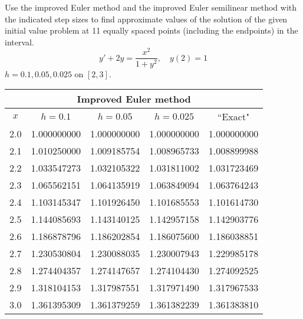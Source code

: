 \documentclass{ximera}
\begin{document}
\begin{problem}\label{exer:3.2.22} Use the improved Euler method and the improved Euler semilinear method with the indicated step sizes to find approximate values of the solution of the given initial value problem at 11 equally spaced points (including the endpoints) in the interval.
$$y'+2y=\frac{x^2}{1+y^2},\quad y(2)=1$$
 $h=0.1,0.05,0.025$ on $[2,3]$.

 \begin{solution}
     {\small
\begin{tabular}{|c|r|r|r|r|}
\hline
\multicolumn{5}{|c|}{Improved Euler method}\\\hline
\multicolumn{1}{|c|}{$x$}&
\multicolumn{1}{|c|}{$h=0.1$}&
\multicolumn{1}{|c|}{$h=0.05$}&
\multicolumn{1}{|c|}{$h=0.025$}&
\multicolumn{1}{|c|}{``Exact"}\\ \hline
2.0 & 1.000000000 & 1.000000000 & 1.000000000 & 1.000000000 \\
2.1 & 1.010250000 & 1.009185754 & 1.008965733 & 1.008899988 \\
2.2 & 1.033547273 & 1.032105322 & 1.031811002 & 1.031723469 \\
2.3 & 1.065562151 & 1.064135919 & 1.063849094 & 1.063764243 \\
2.4 & 1.103145347 & 1.101926450 & 1.101685553 & 1.101614730 \\
2.5 & 1.144085693 & 1.143140125 & 1.142957158 & 1.142903776 \\
2.6 & 1.186878796 & 1.186202854 & 1.186075600 & 1.186038851 \\
2.7 & 1.230530804 & 1.230088035 & 1.230007943 & 1.229985178 \\
2.8 & 1.274404357 & 1.274147657 & 1.274104430 & 1.274092525 \\
2.9 & 1.318104153 & 1.317987551 & 1.317971490 & 1.317967533 \\
3.0 & 1.361395309 & 1.361379259 & 1.361382239 & 1.361383810 \\
\hline
\end{tabular}}


\end{solution}
\end{problem}
\end{document}

